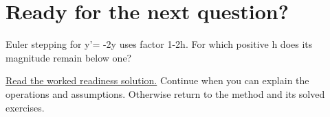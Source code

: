 \section*{Ready for the next question?}
\label{readiness:dynamics}
Euler stepping for y'= -2y uses factor 1-2h. For which positive h does its magnitude remain below one?
\par\hyperref[solution:ready:dynamics]{Read the worked readiness solution.} Continue when you can explain the operations and assumptions. Otherwise return to the method and its solved exercises.
